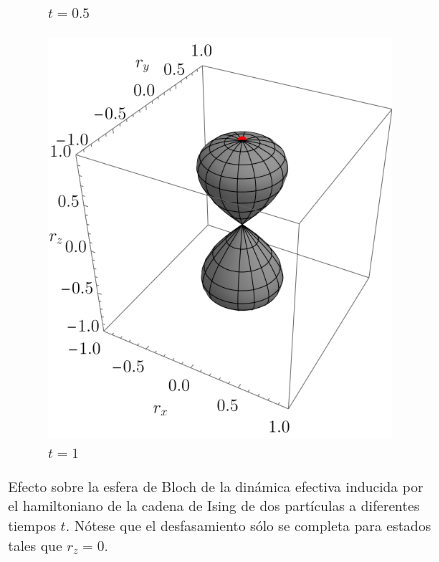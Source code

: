 \begin{figure}[ht!]
\begin{subfigure}{0.32\textwidth}
      \caption{$t=0.5$}
    \end{subfigure}
    \begin{subfigure}{0.32\textwidth}
      \centering
      \includegraphics[width=0.9\linewidth]{chapter4/figures_special/sphere_Ising_t=1._z=0.9_p=0.5.png}
      \caption{$t=1$}
    \end{subfigure}
    \caption{Efecto sobre la esfera de Bloch de la dinámica efectiva inducida por el hamiltoniano de la cadena de Ising de dos partículas a diferentes tiempos $t$. Nótese que el desfasamiento sólo se completa para estados tales que $r_{z}=0$.\label{fig:Ising_p0.5_Sequence}}
\end{figure}




